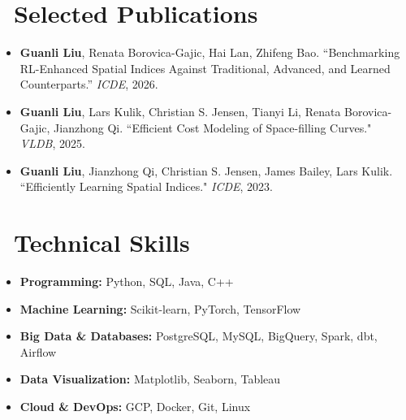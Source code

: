 \documentclass{resume}
\begin{document}
\section{\faFile\ \textbf{Selected Publications}}
\begin{itemize}
\item \textbf{Guanli Liu}, Renata Borovica-Gajic, Hai Lan, Zhifeng Bao.  
``Benchmarking RL-Enhanced Spatial Indices Against Traditional, Advanced, and Learned Counterparts.''  
\textit{ICDE}, 2026. 

 \item \textbf{Guanli Liu}, Lars Kulik, Christian S. Jensen, Tianyi Li, Renata Borovica-Gajic, Jianzhong Qi.  
  ``Efficient Cost Modeling of Space-filling Curves." \textit{VLDB}, 2025.  


  \item \textbf{Guanli Liu}, Jianzhong Qi, Christian S. Jensen, James Bailey, Lars Kulik.  
  ``Efficiently Learning Spatial Indices." \textit{ICDE}, 2023.  

  
\end{itemize}

\section{\faCogs\ \textbf{Technical Skills}}
\begin{itemize}[parsep=0.5ex]
  \item \textbf{Programming:} Python, SQL, Java, C++
  \item \textbf{Machine Learning:} Scikit-learn, PyTorch, TensorFlow
  \item \textbf{Big Data \& Databases:} PostgreSQL, MySQL, BigQuery, Spark, dbt, Airflow
  \item \textbf{Data Visualization:} Matplotlib, Seaborn, Tableau
  \item \textbf{Cloud \& DevOps:} GCP, Docker, Git, Linux
\end{itemize}
\end{document}
